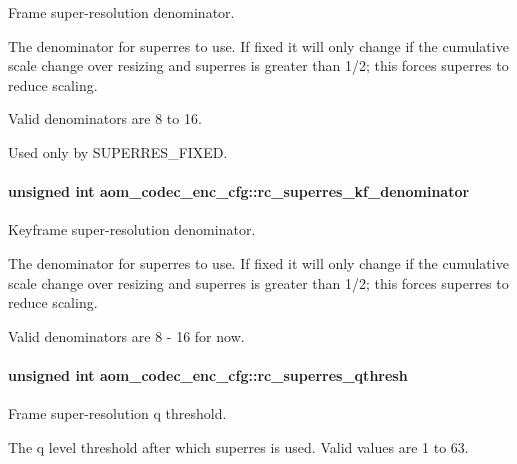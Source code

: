 Frame super-\/resolution denominator. 

The denominator for superres to use. If fixed it will only change if the cumulative scale change over resizing and superres is greater than 1/2; this forces superres to reduce scaling.

Valid denominators are 8 to 16.

Used only by S\+U\+P\+E\+R\+R\+E\+S\+\_\+\+F\+I\+X\+ED. 
\paragraph[{\texorpdfstring{rc\+\_\+superres\+\_\+kf\+\_\+denominator}{rc_superres_kf_denominator}}]{\setlength{\rightskip}{0pt plus 5cm}unsigned int aom\+\_\+codec\+\_\+enc\+\_\+cfg\+::rc\+\_\+superres\+\_\+kf\+\_\+denominator}\hypertarget{structaom__codec__enc__cfg_a4b5ed538fedccae4805fec4a58187fa7}{}\label{structaom__codec__enc__cfg_a4b5ed538fedccae4805fec4a58187fa7}


Keyframe super-\/resolution denominator. 

The denominator for superres to use. If fixed it will only change if the cumulative scale change over resizing and superres is greater than 1/2; this forces superres to reduce scaling.

Valid denominators are 8 -\/ 16 for now. 
\paragraph[{\texorpdfstring{rc\+\_\+superres\+\_\+qthresh}{rc_superres_qthresh}}]{\setlength{\rightskip}{0pt plus 5cm}unsigned int aom\+\_\+codec\+\_\+enc\+\_\+cfg\+::rc\+\_\+superres\+\_\+qthresh}\hypertarget{structaom__codec__enc__cfg_a64d3517b2cef17cd57ec3f659ad0f2ab}{}\label{structaom__codec__enc__cfg_a64d3517b2cef17cd57ec3f659ad0f2ab}


Frame super-\/resolution q threshold. 

The q level threshold after which superres is used. Valid values are 1 to 63.

